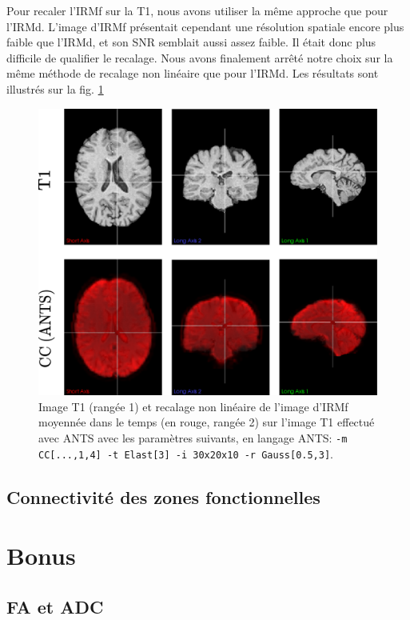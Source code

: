 \documentclass[a4paper]{article}
\begin{document}
Pour recaler l'IRMf sur la T1, nous avons utiliser la même approche que pour l'IRMd. L'image d'IRMf présentait cependant une résolution spatiale encore plus faible que l'IRMd, et son SNR semblait aussi assez faible. Il était donc plus difficile de qualifier le recalage. Nous avons finalement arrêté notre choix sur la même méthode de recalage non linéaire que pour l'IRMd. Les résultats sont illustrés sur la fig. \ref{fmri-to-t1}

\begin{figure}
\begin{center}
\includegraphics[scale=0.5]{fmri-to-t1}
\caption{Image T1 (rangée 1) et recalage non linéaire de l'image d'IRMf moyennée dans le temps (en rouge, rangée 2) sur l'image T1 effectué avec ANTS avec les paramètres suivants, en langage ANTS: \lstinline{-m CC[...,1,4] -t Elast[3] -i 30x20x10 -r Gauss[0.5,3]}. \label{fmri-to-t1}}
\end{center}
\end{figure}  

\subsection{Connectivité des zones fonctionnelles}

\section{Bonus}

\subsection{FA et ADC}
\end{document}
